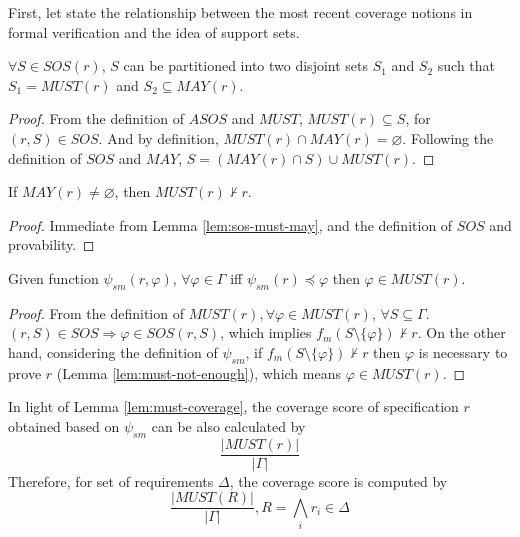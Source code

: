 First, let state the relationship between the most recent coverage notions in formal verification and the idea of support sets.

\begin{lemma}
  \label{lem:sos-must-may}
 $\forall S \in SOS(r)$, $S$ can be partitioned into two disjoint sets $S_1$ and $S_2$
  such that $S_1 = MUST(r)$ and $S_2 \subseteq MAY(r)$.
\end{lemma}
\begin{proof}
 From the definition of $ASOS$ and $MUST$, $MUST(r) \subseteq S$, for $(r, S) \in SOS$. And
 by definition, $MUST(r) \cap MAY(r) = \varnothing$. Following the definition of $SOS$
 and $MAY$, $S = (MAY(r) \cap S) \cup MUST(r)$.
\end{proof}
\vspace{2mm}

\begin{lemma}
  \label{lem:must-not-enough}
  If $MAY(r) \neq \varnothing$, then $MUST(r) \nvdash r$.
\end{lemma}
\begin{proof}
 Immediate from Lemma \ref{lem:sos-must-may}, and the definition of $SOS$ and provability.
\end{proof}
\vspace{2mm}

\begin{lemma}
  \label{lem:must-coverage}
  Given function $\psi_{sm}(r, \varphi)$, $\forall \varphi \in \Gamma$ iff
  $\psi_{sm} (r) \preccurlyeq \varphi$ then  $\varphi \in MUST(r)$.

\end{lemma}
\begin{proof}
 From the definition of $MUST(r), \forall \varphi \in MUST (r)$, $\forall S \subseteq \Gamma$. $(r, S) \in SOS \Rightarrow \varphi \in SOS(r, S)$,
 which implies $f_m (S \setminus \{ \varphi \}) \nvdash r$.
 On the other hand, considering the definition of $\psi_{sm}$, if
 $f_m (S \setminus \{ \varphi \}) \nvdash r$ then $\varphi$ is necessary to prove $r$ (Lemma \ref{lem:must-not-enough}), which means $\varphi \in MUST(r)$.
\end{proof}
\vspace{2mm}

In light of Lemma \ref{lem:must-coverage}, the coverage score of specification $r$ obtained based on $\psi_{sm}$ can be also calculated by
$$\frac{|MUST(r)|}{|\Gamma|}$$
Therefore, for set of requirements $\Delta$, the coverage score is computed by $$\frac{|MUST(R)|}{|\Gamma|},\xspace  R = \bigwedge_{i} {r_i \in \Delta}$$


